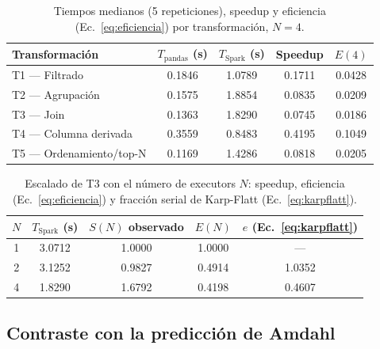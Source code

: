 \documentclass[11pt,a4paper]{article}
\begin{document}
    \begin{table}[h]
        \centering
        \caption{Tiempos medianos (5 repeticiones), speedup y eficiencia (Ec.~\ref{eq:eficiencia}) por transformación, $N=4$.}
        \label{tab:tiempos-base}
        \begin{tabular}{lS[table-format=1.4]S[table-format=1.4]S[table-format=1.4]S[table-format=1.4]}
            \toprule
            \textbf{Transformación} & {\textbf{$T_{\text{pandas}}$ (\si{\second})}} & {\textbf{$T_{\text{Spark}}$ (\si{\second})}} & {\textbf{Speedup}} & {\textbf{$E(4)$}} \\
            \midrule
            T1 — Filtrado          & 0.1846 & 1.0789 & 0.1711 & 0.0428 \\
            T2 — Agrupación        & 0.1575 & 1.8854 & 0.0835 & 0.0209 \\
            T3 — Join              & 0.1363 & 1.8290 & 0.0745 & 0.0186 \\
            T4 — Columna derivada   & 0.3559 & 0.8483 & 0.4195 & 0.1049 \\
            T5 — Ordenamiento/top-N & 0.1169 & 1.4286 & 0.0818 & 0.0205 \\
            \bottomrule
        \end{tabular}
    \end{table}

    \begin{table}[h]
        \centering
        \caption{Escalado de T3 con el número de executors $N$: speedup, eficiencia (Ec.~\ref{eq:eficiencia}) y fracción serial de Karp-Flatt (Ec.~\ref{eq:karpflatt}).}
        \label{tab:escalado-t3}
        \begin{tabular}{cS[table-format=1.4]S[table-format=1.4]S[table-format=1.4]S[table-format=1.4]}
            \toprule
            \textbf{$N$} & {\textbf{$T_{\text{Spark}}$ (\si{\second})}} & {\textbf{$S(N)$ observado}} & {\textbf{$E(N)$}} & {\textbf{$e$ (Ec.~\ref{eq:karpflatt})}} \\
             & 3.0712 & 1.0000 & 1.0000 & {---} \\
            2 & 3.1252 & 0.9827 & 0.4914 & 1.0352 \\
            4 & 1.8290 & 1.6792 & 0.4198 & 0.4607 \\
            \bottomrule
        \end{tabular}
    \end{table}

    \subsection{Contraste con la predicción de Amdahl}
    \label{subsec:contraste-amdahl}
\end{document}
